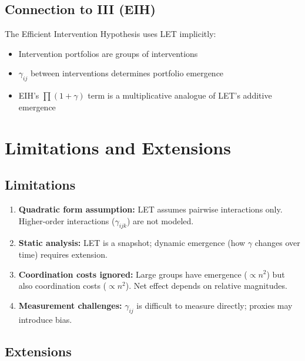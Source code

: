\subsection{Connection to III (EIH)}

The Efficient Intervention Hypothesis uses LET implicitly:

\begin{itemize}
\item Intervention portfolios are groups of interventions
\item $\gamma_{ij}$ between interventions determines portfolio emergence
\item EIH's $\prod(1+\gamma)$ term is a multiplicative analogue of LET's
additive emergence
\end{itemize}


\section{Limitations and Extensions}
\label{sec:let-limitations}

\subsection{Limitations}

\begin{enumerate}
\item \textbf{Quadratic form assumption:} LET assumes pairwise interactions
only. Higher-order interactions ($\gamma_{ijk}$) are not modeled.

\item \textbf{Static analysis:} LET is a snapshot; dynamic emergence
(how $\gamma$ changes over time) requires extension.

\item \textbf{Coordination costs ignored:} Large groups have emergence
($\propto n^2$) but also coordination costs ($\propto n^2$). Net effect
depends on relative magnitudes.

\item \textbf{Measurement challenges:} $\gamma_{ij}$ is difficult to
measure directly; proxies may introduce bias.
\end{enumerate}

\subsection{Extensions}

